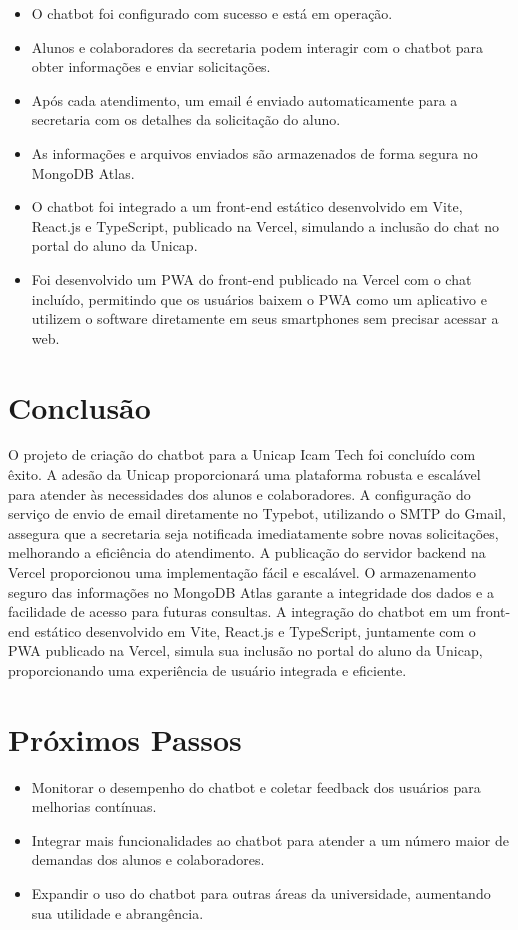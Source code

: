 \documentclass[12pt,a4paper]{article} %
\begin{document}
\begin{itemize}
    \item O chatbot foi configurado com sucesso e está em operação.
    \item Alunos e colaboradores da secretaria podem interagir com o chatbot para obter informações e enviar solicitações.
    \item Após cada atendimento, um email é enviado automaticamente para a secretaria com os detalhes da solicitação do aluno.
    \item As informações e arquivos enviados são armazenados de forma segura no MongoDB Atlas.
    \item O chatbot foi integrado a um front-end estático desenvolvido em Vite, React.js e TypeScript, publicado na Vercel, simulando a inclusão do chat no portal do aluno da Unicap.
    \item Foi desenvolvido um PWA do front-end publicado na Vercel com o chat incluído, permitindo que os usuários baixem o PWA como um aplicativo e utilizem o software diretamente em seus smartphones sem precisar acessar a web.
\end{itemize}

\section{Conclusão}
O projeto de criação do chatbot para a Unicap Icam Tech foi concluído com êxito. A adesão da Unicap proporcionará uma plataforma robusta e escalável para atender às necessidades dos alunos e colaboradores. A configuração do serviço de envio de email diretamente no Typebot, utilizando o SMTP do Gmail, assegura que a secretaria seja notificada imediatamente sobre novas solicitações, melhorando a eficiência do atendimento. A publicação do servidor backend na Vercel proporcionou uma implementação fácil e escalável. O armazenamento seguro das informações no MongoDB Atlas garante a integridade dos dados e a facilidade de acesso para futuras consultas. A integração do chatbot em um front-end estático desenvolvido em Vite, React.js e TypeScript, juntamente com o PWA publicado na Vercel, simula sua inclusão no portal do aluno da Unicap, proporcionando uma experiência de usuário integrada e eficiente.

\section{Próximos Passos}

\begin{itemize}
    \item Monitorar o desempenho do chatbot e coletar feedback dos usuários para melhorias contínuas.
    \item Integrar mais funcionalidades ao chatbot para atender a um número maior de demandas dos alunos e colaboradores.
    \item Expandir o uso do chatbot para outras áreas da universidade, aumentando sua utilidade e abrangência.
\end{itemize}
\end{document}
